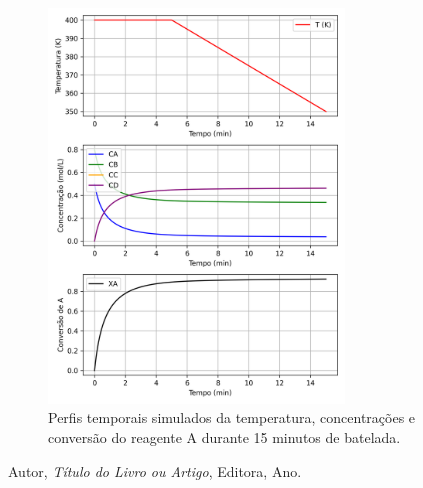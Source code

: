 \documentclass{article}
\begin{document}


\begin{figure}[h!]
  \centering
  \includegraphics[width=0.7\textwidth]{figuras/questao3_reator.png}
  \caption{Perfis temporais simulados da temperatura, concentrações e conversão do reagente A durante 15 minutos de batelada.}
  \label{fig:questao3}
\end{figure}



\begin{thebibliography}{9}
  Autor, \emph{Título do Livro ou Artigo}, Editora, Ano.
\end{thebibliography}
\end{document}
